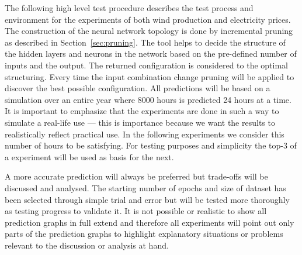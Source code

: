 The following high level test procedure describes the test process and environment for the experiments of both wind production and electricity prices. 
\\[0.5cm]
The construction of the neural network topology is done by incremental pruning as described in Section~\ref{sec:pruning}. The tool helps to decide the structure of the hidden layers and neurons in the network based on the pre-defined number of inputs and the output. The returned configuration is considered to the optimal structuring. Every time the input combination change pruning will be applied to discover the best possible configuration. All predictions will be based on a simulation over an entire year where 8000 hours is predicted 24 hours at a time. It is important to emphasize that the experiments are done in such a way to simulate a real-life use --- this is importance because we want the results to realistically reflect practical use. In the following experiments we consider this number of hours to be satisfying. For testing purposes and simplicity the top-3 of a experiment will be used as basis for the next. 

A more accurate prediction will always be preferred but trade-offs will be discussed and analysed. The starting number of epochs and size of dataset has been selected through simple trial and error but will be tested more thoroughly as testing progress to validate it. It is not possible or realistic to show all prediction graphs in full extend and therefore all experiments will point out only parts of the prediction graphs to highlight explanatory situations or problems relevant to the discussion or analysis at hand.

